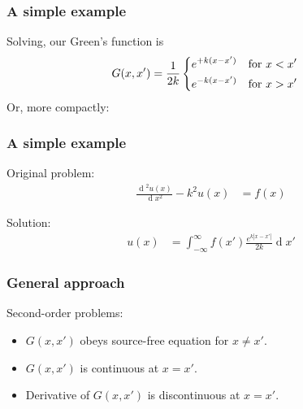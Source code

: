 \documentclass[12 pt, compress, handout, intlimits]{beamer}
\renewcommand{\d}{\operatorname{d}\!}
\newcommand*\widefbox[1]{\fbox{\hspace{1em}#1\hspace{1em}}}
\begin{document}
\begin{frame}[fragile]
    \frametitle{A simple example}
    Solving, our Green's function is
    \begin{align*}
        G(x,x') &= \frac{1}{2k} 
        \begin{dcases} 
            e^{+k (x - x')} & \text{for } x < x'
            \\
            e^{-k (x - x')} & \text{for } x > x'
        \end{dcases}
    \end{align*}
    Or, more compactly:
    

\end{frame}

\note{
}

\begin{frame}[fragile]
    \frametitle{A simple example}

    Original problem:
    \begin{align*}
        \frac{\d^2 u(x)}{\d x^2} - k^2 u(x) &= f(x)
    \end{align*}

    Solution:
    \begin{align*}
        u(x) &= \int_{-\infty}^{\infty} f(x') \frac{e^{k|x - x'|}}{2k} \d x'
    \end{align*}
    
\end{frame}


\begin{frame}[fragile]
    \frametitle{General approach}

    Second-order problems:
    \begin{itemize}
    \item
        $ G(x,x') $ obeys source-free equation for $ x \neq x' $.
    \item
        $ G(x,x') $ is continuous at $ x = x' $.
    \item
        Derivative of $ G(x,x') $ is discontinuous at $ x = x' $.
    \end{itemize}
    
\end{frame}
\end{document}
